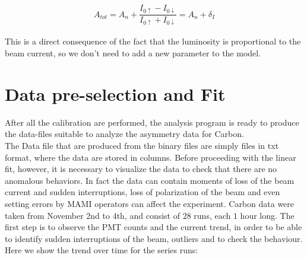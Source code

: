 \begin{align*}
A_{tot} = A_{n} + \dfrac{I_{0 \uparrow} - I_{0 \downarrow}}{I_{0 \uparrow} + I_{0 \downarrow}} = A_{n} + \delta_{I}
\end{align*}

This is a direct consequence of the fact that the luminosity is proportional to the beam current, so we don't need to add a new parameter to the model.

\section{Data pre-selection and Fit}

After all the calibration are performed, the analysis program is ready to produce the data-files suitable to analyze the asymmetry data for Carbon. \\
The Data file that are produced from the binary files are simply files in txt format, where the data are stored in columns. Before proceeding with the linear fit, however, it is necessary to visualize the data to check that there are no anomalous behaviors. In fact the data can contain moments of loss of the beam current and sudden interruptions, loss of polarization of the beam and even setting errors by MAMI operators can affect the experiment. Carbon data were taken from November 2nd to 4th, and consist of $28$ runs, each $1$ hour long.
The first step is to observe the PMT counts and the current trend, in order to be able to identify sudden interruptions of the beam, outliers and to check the behaviour. Here we show the trend over time for the series runs: 

\begin{figure}[hbtp]
\centering
{}
\end{figure}


